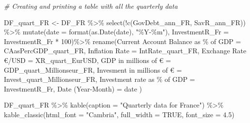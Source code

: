 \documentclass[
]{article}
\newenvironment{Shaded}{\begin{snugshade}}{\end{snugshade}}
\newcommand{\AttributeTok}[1]{\textcolor[rgb]{0.77,0.63,0.00}{#1}}
\newcommand{\CommentTok}[1]{\textcolor[rgb]{0.56,0.35,0.01}{\textit{#1}}}
\newcommand{\ConstantTok}[1]{\textcolor[rgb]{0.00,0.00,0.00}{#1}}
\newcommand{\DecValTok}[1]{\textcolor[rgb]{0.00,0.00,0.81}{#1}}
\newcommand{\FloatTok}[1]{\textcolor[rgb]{0.00,0.00,0.81}{#1}}
\newcommand{\FunctionTok}[1]{\textcolor[rgb]{0.00,0.00,0.00}{#1}}
\newcommand{\NormalTok}[1]{#1}
\newcommand{\OtherTok}[1]{\textcolor[rgb]{0.56,0.35,0.01}{#1}}
\newcommand{\SpecialCharTok}[1]{\textcolor[rgb]{0.00,0.00,0.00}{#1}}
\newcommand{\StringTok}[1]{\textcolor[rgb]{0.31,0.60,0.02}{#1}}
\begin{document}
\begin{Shaded}
\begin{Highlighting}[]
\CommentTok{\# Creating and printing a table with all the quarterly data}

\NormalTok{DF\_quart\_FR }\OtherTok{\textless{}{-}}\NormalTok{ DF\_FR }\SpecialCharTok{\%\textgreater{}\%}
  \FunctionTok{select}\NormalTok{(}\SpecialCharTok{!}\FunctionTok{c}\NormalTok{(GovDebt\_ann\_FR, SavR\_ann\_FR)) }\SpecialCharTok{\%\textgreater{}\%}
  \FunctionTok{mutate}\NormalTok{(}\AttributeTok{date =} \FunctionTok{format}\NormalTok{(}\FunctionTok{as.Date}\NormalTok{(date), }\StringTok{"\%Y{-}\%m"}\NormalTok{), }\AttributeTok{InvestmentR\_Fr =}\NormalTok{ InvestmentR\_Fr }\SpecialCharTok{*} \DecValTok{100}\NormalTok{)}\SpecialCharTok{\%\textgreater{}\%}
  \FunctionTok{rename}\NormalTok{(}\StringTok{\textasciigrave{}}\AttributeTok{Current Account Balance as \% of GDP}\StringTok{\textasciigrave{}} \OtherTok{=}\NormalTok{ CAasPercGDP\_quart\_FR,}
          \StringTok{\textasciigrave{}}\AttributeTok{Inflation Rate}\StringTok{\textasciigrave{}} \OtherTok{=}\NormalTok{ IntRate\_quart\_FR,}
          \StringTok{\textasciigrave{}}\AttributeTok{Exchange Rate €/USD}\StringTok{\textasciigrave{}} \OtherTok{=}\NormalTok{ XR\_quart\_EurUSD, }
          \StringTok{\textasciigrave{}}\AttributeTok{GDP in millions of €}\StringTok{\textasciigrave{}} \OtherTok{=}\NormalTok{ GDP\_quart\_Millionseur\_FR, }
          \StringTok{\textasciigrave{}}\AttributeTok{Invesment in millions of €}\StringTok{\textasciigrave{}} \OtherTok{=}\NormalTok{ Invest\_quart\_Millionseur\_FR,}
          \StringTok{\textasciigrave{}}\AttributeTok{Investment rate as \% of GDP}\StringTok{\textasciigrave{}} \OtherTok{=}\NormalTok{ InvestmentR\_Fr,}
         \StringTok{\textasciigrave{}}\AttributeTok{Date (Year{-}Month)}\StringTok{\textasciigrave{}} \OtherTok{=}\NormalTok{ date}
\NormalTok{          ) }

\NormalTok{DF\_quart\_FR }\SpecialCharTok{\%\textgreater{}\%} 
  \FunctionTok{kable}\NormalTok{(}\AttributeTok{caption =} \StringTok{"Quarterly data for France"}\NormalTok{) }\SpecialCharTok{\%\textgreater{}\%}
  \FunctionTok{kable\_classic}\NormalTok{(}\AttributeTok{html\_font =} \StringTok{"Cambria"}\NormalTok{, }\AttributeTok{full\_width =} \ConstantTok{TRUE}\NormalTok{, }\AttributeTok{font\_size =} \FloatTok{4.5}\NormalTok{)}
\end{Highlighting}
\end{Shaded}
\end{document}
